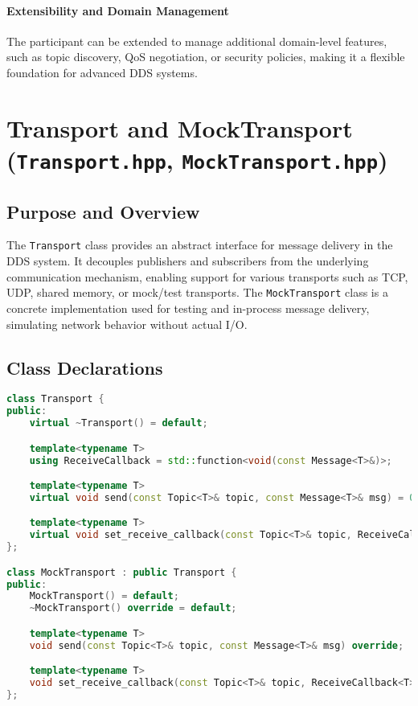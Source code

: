 \documentclass[12pt]{report}
\begin{document}
\paragraph{Extensibility and Domain Management}
The participant can be extended to manage additional domain-level features, such as topic discovery, QoS negotiation, or security policies, making it a flexible foundation for advanced DDS systems.

\section{Transport and MockTransport (\texttt{Transport.hpp}, \texttt{MockTransport.hpp})}

\subsection{Purpose and Overview}
The \texttt{Transport} class provides an abstract interface for message delivery in the DDS system. It decouples publishers and subscribers from the underlying communication mechanism, enabling support for various transports such as TCP, UDP, shared memory, or mock/test transports. The \texttt{MockTransport} class is a concrete implementation used for testing and in-process message delivery, simulating network behavior without actual I/O.

\subsection{Class Declarations}
\begin{lstlisting}[language=C++]
class Transport {
public:
    virtual ~Transport() = default;

    template<typename T>
    using ReceiveCallback = std::function<void(const Message<T>&)>;

    template<typename T>
    virtual void send(const Topic<T>& topic, const Message<T>& msg) = 0;

    template<typename T>
    virtual void set_receive_callback(const Topic<T>& topic, ReceiveCallback<T> cb) = 0;
};

class MockTransport : public Transport {
public:
    MockTransport() = default;
    ~MockTransport() override = default;

    template<typename T>
    void send(const Topic<T>& topic, const Message<T>& msg) override;

    template<typename T>
    void set_receive_callback(const Topic<T>& topic, ReceiveCallback<T> cb) override;
};
\end{lstlisting}
\end{document}
